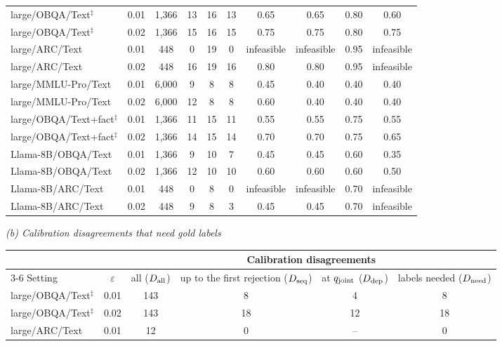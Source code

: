 \begin{table}[!htbp]
\begin{tabular*}{\linewidth}{@{}l@{\hspace{5pt}\extracolsep{\fill}}ccccccccc@{}}
large/OBQA/Text$^\ddagger$ & 0.01 & 1,366 & 13 & 16 & 13 & 0.65 & 0.65 & 0.80 & 0.60\\
large/OBQA/Text$^\ddagger$ & 0.02 & 1,366 & 15 & 16 & 15 & 0.75 & 0.75 & 0.80 & 0.75\\
\addlinespace[2pt]
large/ARC/Text & 0.01 & 448 & 0 & 19 & 0 & infeasible & infeasible & 0.95 & infeasible\\
large/ARC/Text & 0.02 & 448 & 16 & 19 & 16 & 0.80 & 0.80 & 0.95 & infeasible\\
\addlinespace[2pt]
large/MMLU-Pro/Text & 0.01 & 6,000 & 9 & 8 & 8 & 0.45 & 0.40 & 0.40 & 0.40\\
large/MMLU-Pro/Text & 0.02 & 6,000 & 12 & 8 & 8 & 0.60 & 0.40 & 0.40 & 0.40\\
\addlinespace[2pt]
large/OBQA/Text+fact$^\ddagger$ & 0.01 & 1,366 & 11 & 15 & 11 & 0.55 & 0.55 & 0.75 & 0.55\\
large/OBQA/Text+fact$^\ddagger$ & 0.02 & 1,366 & 14 & 15 & 14 & 0.70 & 0.70 & 0.75 & 0.65\\
\addlinespace[2pt]
Llama-8B/OBQA/Text & 0.01 & 1,366 & 9 & 10 & 7 & 0.45 & 0.45 & 0.60 & 0.35\\
Llama-8B/OBQA/Text & 0.02 & 1,366 & 12 & 10 & 10 & 0.60 & 0.60 & 0.60 & 0.50\\
\addlinespace[2pt]
Llama-8B/ARC/Text & 0.01 & 448 & 0 & 8 & 0 & infeasible & infeasible & 0.70 & infeasible\\
Llama-8B/ARC/Text & 0.02 & 448 & 9 & 8 & 3 & 0.45 & 0.45 & 0.70 & infeasible\\\bottomrule
\end{tabular*}
\par\vspace{17pt}
\textit{(b) Calibration disagreements that need gold labels}\par\smallskip
\begin{tabular*}{\linewidth}{@{}l@{\hspace{5pt}\extracolsep{\fill}}ccccc@{}}\toprule
& & \multicolumn{4}{c}{Calibration disagreements}\\\cmidrule(l){3-6}
Setting & $\varepsilon$ & all ($D_{\rm all}$) & up to the first rejection ($D_{\rm seq}$) & at $q_{\rm joint}$ ($D_{\rm dep}$) & labels needed ($D_{\rm need}$)\\\midrule
large/OBQA/Text$^\ddagger$ & 0.01 & 143 & 8 & 4 & 8\\
large/OBQA/Text$^\ddagger$ & 0.02 & 143 & 18 & 12 & 18\\
\addlinespace[2pt]
large/ARC/Text & 0.01 & 12 & 0 & -- & 0\\

\end{tabular*}
\end{table}
